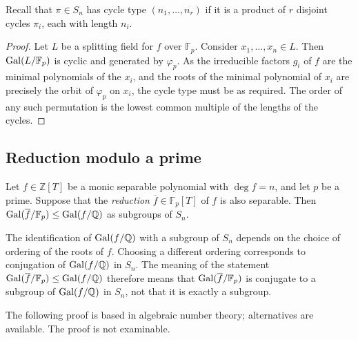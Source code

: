 Recall that \( \pi \in S_n \) has cycle type \( (n_1, \dots, n_r) \) if it is a product of \( r \) disjoint cycles \( \pi_i \), each with length \( n_i \).
\begin{proof}
	Let \( L \) be a splitting field for \( f \) over \( \mathbb F_p \).
	Consider \( x_1, \dots, x_n \in L \).
	Then \( \operatorname{Gal}(L/\mathbb F_p) \) is cyclic and generated by \( \varphi_p \).
	As the irreducible factors \( g_i \) of \( f \) are the minimal polynomials of the \( x_i \), and the roots of the minimal polynomial of \( x_i \) are precisely the orbit of \( \varphi_p \) on \( x_i \), the cycle type must be as required.
	The order of any such permutation is the lowest common multiple of the lengths of the cycles.
\end{proof}

\subsection{Reduction modulo a prime}
\begin{theorem}
	Let \( f \in \mathbb Z[T] \) be a monic separable polynomial with \( \deg f = n \), and let \( p \) be a prime.
	Suppose that the \emph{reduction} \( \overline f \in \mathbb F_p[T] \) of \( f \) is also separable.
	Then \( \operatorname{Gal}(\overline f / \mathbb F_p) \leq \operatorname{Gal}(f/\mathbb Q) \) as subgroups of \( S_n \).
\end{theorem}
\begin{remark}
	The identification of \( \operatorname{Gal}(f/\mathbb Q) \) with a subgroup of \( S_n \) depends on the choice of ordering of the roots of \( f \).
	Choosing a different ordering corresponds to conjugation of \( \operatorname{Gal}(f/\mathbb Q) \) in \( S_n \).
	The meaning of the statement \( \operatorname{Gal}(\overline f/\mathbb F_p) \leq \operatorname{Gal}(f/\mathbb Q) \) therefore means that \( \operatorname{Gal}(\overline f/\mathbb F_p) \) is conjugate to a subgroup of \( \operatorname{Gal}(f/\mathbb Q) \) in \( S_n \), not that it is exactly a subgroup.
\end{remark}
The following proof is based in algebraic number theory; alternatives are available.
The proof is not examinable.
